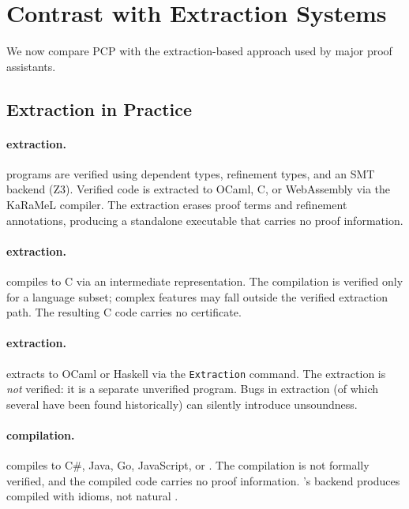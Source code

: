 \documentclass[11pt]{article}
\newcommand{\pcp}{\textsc{PCP}}           %
\begin{document}
\section{Contrast with Extraction Systems}\label{sec:extraction}

We now compare \pcp{} with the extraction-based approach used by
major proof assistants.

\subsection{Extraction in Practice}

\paragraph{\Fstar{} extraction.}
\Fstar{} programs are verified using dependent types, refinement
types, and an SMT backend (Z3).  Verified code is extracted to
OCaml, C, or WebAssembly via the KaRaMeL compiler.  The extraction
erases proof terms and refinement annotations, producing a
standalone executable that carries no proof information.

\paragraph{\LEAN{} extraction.}
\LEAN{} compiles to C via an intermediate representation.  The
compilation is verified only for a language subset; complex features
may fall outside the verified extraction path.  The resulting C code
carries no certificate.

\paragraph{\Coq{} extraction.}
\Coq{} extracts to OCaml or Haskell via the \texttt{Extraction}
command.  The extraction is \emph{not} verified: it is a separate
unverified program.  Bugs in extraction (of which several have been
found historically) can silently introduce unsoundness.

\paragraph{\Dafny{} compilation.}
\Dafny{} compiles to C\#, Java, Go, JavaScript, or \Python{}.
The compilation is not formally verified, and the compiled code
carries no proof information.  \Dafny{}'s \Python{} backend produces
compiled \Python{} with \Dafny{} idioms, not natural \Python{}.
\end{document}
